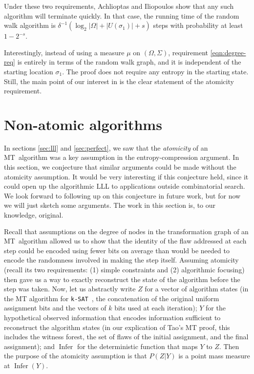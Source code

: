\documentclass[twocolumn]{article}
\newcommand{\ksat}{\texttt{k-SAT}~}
\newcommand{\mt}{MT~}
\begin{document}
Under these two requirements, Achlioptas and Iliopoulos show that any such algorithm will terminate quickly.  In that case, the running time of the random walk algorithm is $\delta^{-1} (\log_2 |\Omega| + |U(\sigma_1)| + s)$ steps with probability at least $1 - 2^{-s}$.

Interestingly, instead of using a measure $\mu$ on $(\Omega, \Sigma)$, requirement \ref{eqn:degree-req} is entirely in terms of the random walk graph, and it is independent of the starting location $\sigma_1$.  The proof does not require any entropy in the starting state.  Still, the main point of our interest in \cite{achlioptas2014random} is the clear statement of the atomicity requirement.

\section{Non-atomic algorithms}
\label{sec:nonatomic}
In sections \ref{sec:lll} and \ref{sec:perfect}, we saw that the \emph{atomicity} of an \mt algorithm was a key assumption in the entropy-compression argument.  In this section, we conjecture that similar arguments could be made without the atomicity assumption.  It would be very interesting if this conjecture held, since it could open up the algorithmic LLL to applications outside combinatorial search.  We look forward to following up on this conjecture in future work, but for now we will just sketch some arguments.  The work in this section is, to our knowledge, original.

Recall that assumptions on the degree of nodes in the transformation graph of an \mt algorithm allowed us to show that the identity of the flaw addressed at each step could be encoded using fewer bits on average than would be needed to encode the randomness involved in making the step itself.  Assuming atomicity (recall its two requirements: (1) simple constraints and (2) algorithmic focusing) then gave us a way to exactly reconstruct the state of the algorithm before the step was taken.  Now, let us abstractly write $Z$ for a vector of algorithm states (in the MT algorithm for \ksat, the concatenation of the original uniform assignment bits and the vectors of $k$ bits used at each iteration); $Y$ for the hypothetical observed information that encodes information sufficient to reconstruct the algorithm states (in our explication of Tao's MT proof, this includes the witness forest, the set of flaws of the initial assignment, and the final assignment); and $\operatorname{Infer}$ for the deterministic function that maps $Y$ to $Z$.  Then the purpose of the atomicity assumption is that $P(Z | Y)$ is a point mass measure at $\operatorname{Infer}(Y)$.
\end{document}
